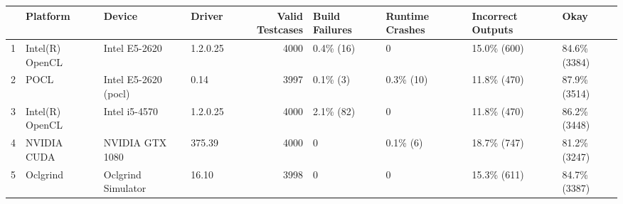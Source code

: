 \begin{tabular}{llllrllll}
\toprule
{} &         Platform &                Device &    Driver &  Valid Testcases & Build Failures & Runtime Crashes & Incorrect Outputs &          Okay \\
\midrule
1 &  Intel(R) OpenCL &         Intel E5-2620 &  1.2.0.25 &             4000 &      0.4\% (16) &               0 &       15.0\% (600) &  84.6\% (3384) \\
2 &             POCL &  Intel E5-2620 (pocl) &      0.14 &             3997 &       0.1\% (3) &       0.3\% (10) &       11.8\% (470) &  87.9\% (3514) \\
3 &  Intel(R) OpenCL &         Intel i5-4570 &  1.2.0.25 &             4000 &      2.1\% (82) &               0 &       11.8\% (470) &  86.2\% (3448) \\
4 &      NVIDIA CUDA &       NVIDIA GTX 1080 &    375.39 &             4000 &              0 &        0.1\% (6) &       18.7\% (747) &  81.2\% (3247) \\
5 &         Oclgrind &    Oclgrind Simulator &     16.10 &             3998 &              0 &               0 &       15.3\% (611) &  84.7\% (3387) \\
\bottomrule
\end{tabular}

